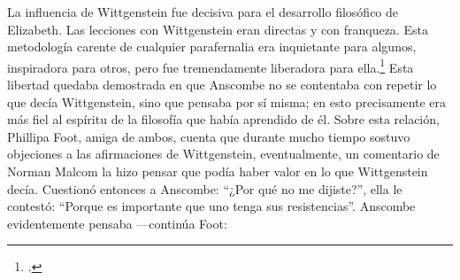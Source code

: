 La influencia de Wittgenstein fue decisiva para el desarrollo filosófico de
Elizabeth. Las lecciones con Wittgenstein eran directas y con franqueza. Esta
metodología carente de cualquier parafernalia era inquietante para algunos,
inspiradora para otros, pero fue tremendamente liberadora para
ella.\footcite[loc 9853 Chapter 4, Section 24, \S5]{monk} Esta libertad
quedaba demostrada en que Anscombe no se contentaba con repetir lo que decía
Wittgenstein, sino que pensaba por sí misma; en esto precisamente era más fiel
al espíritu de la filosofía que había aprendido de él. Sobre esta relación,
Phillipa Foot, amiga de ambos, cuenta que durante mucho tiempo sostuvo
objeciones a las afirmaciones de Wittgenstein, eventualmente, un comentario de
Norman Malcom la hizo pensar que podía haber valor en lo que Wittgenstein decía.
Cuestionó entonces a Anscombe: 
``¿Por qué no me dijiste?'', ella le contestó: ``Porque es importante que uno
tenga sus resistencias''. Anscombe evidentemente pensaba ---continúa Foot: 






